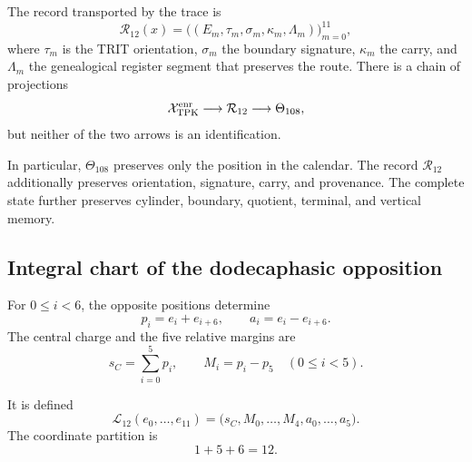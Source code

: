 \begin{definition}
\label{p3-83-c25-s4:def:registro-enriquecido-dodecafasico}
The record transported by the trace is
\[
 \mathcal R_{12}(x)=
 \bigl((E_m,\tau_m,\sigma_m,\kappa_m,\Lambda_m)\bigr)_{m=0}^{11},
\]
where \(\tau_m\) is the TRIT orientation, \(\sigma_m\) the boundary
signature, \(\kappa_m\) the carry, and \(\Lambda_m\) the genealogical register segment
that preserves the route. There is a chain of projections
\[
 \mathcal X_{\rm TPK}^{\rm enr}
 \longrightarrow\mathcal R_{12}
 \longrightarrow\Theta_{108},
\]
but neither of the two arrows is an identification.
\end{definition}

In particular, \(\Theta_{108}\) preserves only the position in the calendar.
The record \(\mathcal R_{12}\) additionally preserves orientation, signature,
carry, and provenance. The complete state further preserves cylinder,
boundary, quotient, terminal, and vertical memory.

\subsection{Integral chart of the dodecaphasic opposition}

For \(0\leq i<6\), the opposite positions determine
\begin{equation}
 p_i=e_i+e_{i+6},
 \qquad
 a_i=e_i-e_{i+6}.
 \label{p3-83-c25-s4:eq:pares-opuestos-registro}
\end{equation}
The central charge and the five relative margins are
\begin{equation}
 s_C=\sum_{i=0}^{5}p_i,
 \qquad
 M_i=p_i-p_5\quad(0\leq i<5).
 \label{p3-83-c25-s4:eq:carga-margenes-registro}
\end{equation}

\begin{definition}
\label{p3-83-c25-s4:def:carta-integral-156}
It is defined
\begin{equation}
 \mathcal L_{12}(e_0,\ldots,e_{11})
 =\bigl(s_C,M_0,\ldots,M_4,a_0,\ldots,a_5\bigr).
 \label{p3-83-c25-s4:eq:carta-integral-156}
\end{equation}
The coordinate partition is
\[
 1+5+6=12.
\]
\end{definition}

